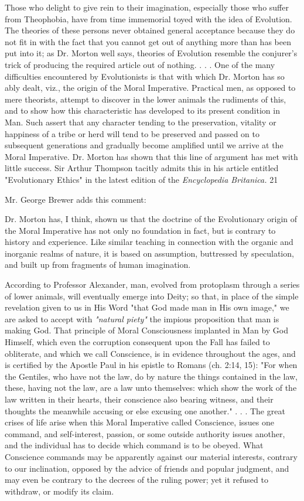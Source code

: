 Those who delight to give rein to their imagination, especially those who suffer from
Theophobia, have from time immemorial toyed with the idea of Evolution. The theories of
these persons never obtained general acceptance because they do not fit in with the fact that
you cannot get out of anything more than has been put into it; as Dr. Morton well says,
theories of Evolution resemble the conjurer's trick of producing the required article out of
nothing. . . . One of the many difficulties encountered by Evolutionists is that with which Dr.
Morton has so ably dealt, viz., the origin of the Moral Imperative. Practical men, as opposed
to mere theorists, attempt to discover in the lower animals the rudiments of this, and to show
how this characteristic has developed to its present condition in Man. Such assert that any
character tending to the preservation, vitality or happiness of a tribe or herd will tend to be
preserved and passed on to subsequent generations and gradually become amplified until we
arrive at the Moral Imperative. Dr. Morton has shown that this line of argument has met with
little success. Sir Arthur Thompson tacitly admits this in his article entitled "Evolutionary
Ethics" in the latest edition of the \textit{Encyclopedia Britanica.} 21

Mr. George Brewer adds this comment:

Dr. Morton has, I think, shown us that the doctrine of the Evolutionary origin of the Moral
Imperative has not only no foundation in fact, but is contrary to history and experience. Like
similar teaching in connection with the organic and inorganic realms of nature, it is based on
assumption, buttressed by speculation, and built up from fragments of human imagination.

According to Professor Alexander, man, evolved from protoplasm through a series of lower
animals, will eventually emerge into Deity; so that, in place of the simple revelation given to
us in His Word "that God made man in His own image," we are asked to accept with \textit{"natural
piety"} the impious proposition that man is making God. That principle of Moral
Consciousness implanted in Man by God Himself, which even the corruption consequent
upon the Fall has failed to obliterate, and which we call Conscience, is in evidence
throughout the ages, and is certified by the Apostle Paul in his epistle to Romans (ch. 2:14,
15): "For when the Gentiles, who have not the law, do by nature the things contained in the
law, these, having not the law, are a law unto themselves: which show the work of the law
written in their hearts, their conscience also bearing witness, and their thoughts the
meanwhile accusing or else excusing one another." . . . The great crises of life arise when this
Moral Imperative called Conscience, issues one command, and self-interest, passion, or some
outside authority issues another, and the individual has to decide which command is to be
obeyed. What Conscience commands may be apparently against our material interests,
contrary to our inclination, opposed by the advice of friends and popular judgment, and may
even be contrary to the decrees of the ruling power; yet it refused to withdraw, or modify its
claim.

